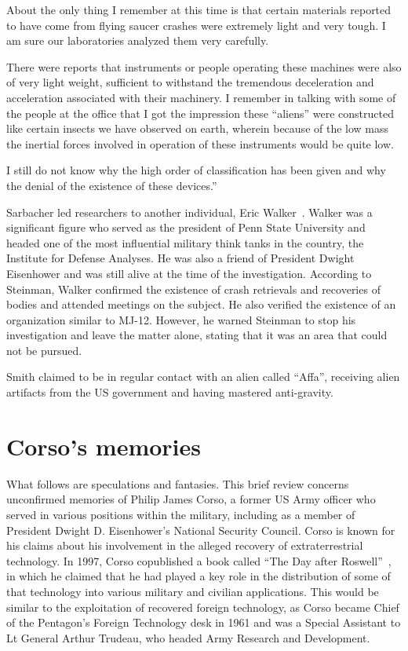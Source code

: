 \begin{svgraybox}
About the only thing I remember at this time is that certain materials reported to have
come from flying saucer crashes were extremely light and very tough. I am sure our
laboratories analyzed them very carefully.

There were reports that instruments or people operating these machines were also of
very light weight, sufficient to withstand the tremendous deceleration and acceleration
associated with their machinery. I remember in talking with some of the people at the
office that I got the impression these ``aliens'' were constructed like certain insects we
have observed on earth, wherein because of the low mass the inertial forces involved in
operation of these instruments would be quite low.

I still do not know why the high order of classification has been given and why the
denial of the existence of these devices.''
\end{svgraybox}

Sarbacher led researchers to another individual, Eric Walker~\cite{DolanDisclosure2019Mar}.
Walker was a significant figure who served as the president of Penn State University and headed one of the most influential military
think tanks in the country, the Institute for Defense Analyses. He was also a friend of President Dwight Eisenhower and was still alive at the time of the investigation. According to Steinman, Walker confirmed the existence of crash retrievals and recoveries of bodies and attended meetings on the subject. He also verified the existence of an organization similar to MJ-12. However, he warned Steinman to stop his investigation and leave the matter alone, stating that it was an area that could not be pursued.

Smith claimed to be in regular contact with an alien called ``Affa'', receiving alien artifacts from the US government and having mastered anti-gravity.

\section{Corso's memories}
\label{2023-UFO-part-Perception-crash-retreivals-CM}

What follows are speculations and fantasies. This brief review concerns unconfirmed memories of Philip James Corso, a former US Army officer who served in various positions within the military, including as a member of President Dwight D. Eisenhower's National Security Council. Corso is known for his claims about his involvement in the alleged recovery of extraterrestrial technology. In 1997, Corso copublished a book called ``The Day after Roswell''~\cite{Corso1998Jun}, in which he claimed that he had played a key role in the distribution of some of that technology into various military and civilian applications. This would be similar to the exploitation of recovered foreign technology, as Corso became Chief of the Pentagon's Foreign Technology desk in 1961 and was a Special Assistant to Lt General Arthur Trudeau, who headed Army Research and Development.

